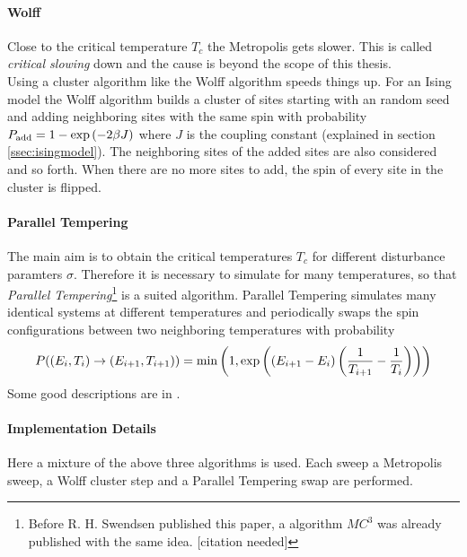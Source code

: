    \paragraph{Wolff}
        Close to the critical temperature \(T_c\) the Metropolis
        gets slower. This is called \emph{critical slowing} down and the
        cause is beyond the scope of this thesis.\\
        Using a cluster algorithm like the Wolff
        algorithm \cite{Wolff1989} speeds things up.
        For an Ising model the Wolff algorithm builds a cluster of sites
        starting with an random seed and adding neighboring sites with
        the same spin with probability
        \(P_{\mathrm{add}} = 1-\exp\left(-2\beta J\right)\)
        where \(J\) is the coupling constant (explained in section
        \ref{ssec:isingmodel}). The neighboring sites of the added sites
        are also considered and so forth. When there are no more sites
        to add, the spin of every site in the cluster is flipped.
        \cite[S. ??]{NewmanBarkema1999} \cite[S. 151f]{Katzgraber2011}

    \paragraph{Parallel Tempering}
        The main aim is to obtain the critical temperatures
        \(T_c\) for different disturbance paramters \(\sigma\).
        Therefore it is necessary to simulate for many temperatures,
        so that \emph{Parallel Tempering}\footnote{Before R. H.
            Swendsen published this paper, a algorithm \(MC^3\) was
            already published with the same idea. [citation needed]}
        \cite{ParallelTempering1986} is a suited algorithm. Parallel
        Tempering simulates many identical systems at different
        temperatures and periodically swaps the spin configurations
        between two neighboring temperatures with probability
        \begin{equation}
            P((E_i,T_i) \to (E_{i+1},T_{i+1})) = \min\left(1,\exp\left(\left(E_{i+1}-E_i\right)\left(\frac{1}{T_{i+1}}-\frac{1}{T_i}\right)\right)\right)
        \end{equation}
        Some good descriptions are in
        \cite[S. ??]{NewmanBarkema1999} \cite[S. 155ff]{Katzgraber2011}.

    \paragraph{Implementation Details}
        Here a mixture of the above three algorithms is used.
        Each sweep a Metropolis sweep, a Wolff cluster step and a
        Parallel Tempering swap are performed.


